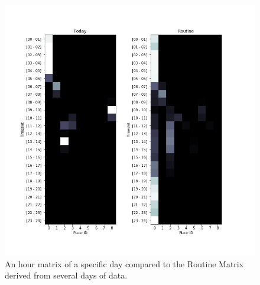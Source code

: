 \begin{figure}
    \centering
    \includegraphics[width=\textwidth]{images/routine.png}
    \caption{An hour matrix of a specific day compared to the Routine Matrix derived from several days of data.}
    \label{fig:routine_example}
\end{figure}


